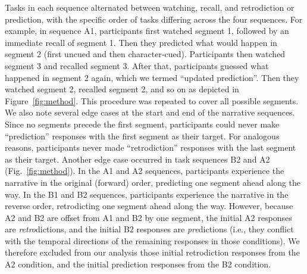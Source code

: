 \documentclass[10pt]{article}
\begin{document}
Tasks in each sequence alternated between watching, recall, and retrodiction or prediction, with the specific order of tasks differing across the four sequences. For example, in sequence A1, participants first watched segment 1, followed by an immediate recall of segment 1. Then they predicted what would happen in segment 2 (first uncued and then character-cued). Participants then watched segment 3 and recalled segment 3. After that, participants guessed what happened in segment 2 again, which we termed ``updated prediction''. Then they watched segment 2, recalled segment 2, and so on as depicted in Figure~\ref{fig:method}.  This procedure was repeated to cover all possible segments.
We also note several edge cases at the start and end of the narrative sequences.  Since no segments precede the first segment, participants could never make ``prediction'' responses with the first segment as their target.  For analogous reasons, participants never made ``retrodiction'' responses with the last segment as their target.  Another edge case occurred in task sequences B2 and A2 (Fig.~\ref{fig:method}).  In the A1 and A2 sequences, participants experience the narrative in the original (forward) order, predicting one segment ahead along the way.  In the B1 and B2 sequences, participants experience the narrative in the reverse order, retrodicting one segment ahead along the way.  However, because A2 and B2 are offset from A1 and B2 by one segment, the initial A2 responses are \textit{retro}dictions, and the initial B2 responses are \textit{pre}dictions (i.e., they conflict with the temporal directions of the remaining responses in those conditions).  We therefore excluded from our analysis those initial retrodiction responses from the A2 condition, and the initial prediction responses from the B2 condition.
\end{document}
